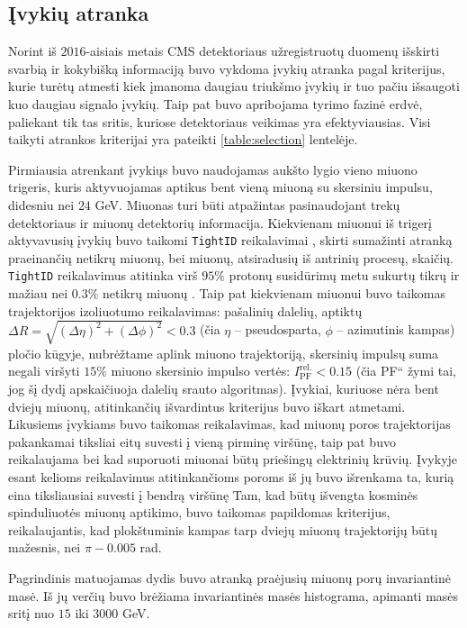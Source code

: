 \documentclass[a4paper, 12pt, oneside]{article}
\newcommand{\ttt}[1]{\texttt{#1}}
\newcommand{\ltq}[1]{{\quotedblbase{}#1\textquotedblleft{}}}
\newlength\q
\begin{document}
\subsection{Įvykių atranka}\label{sec:selection}
Norint iš $2016$-aisiais metais CMS detektoriaus užregistruotų duomenų išskirti svarbią ir kokybišką informaciją
buvo vykdoma įvykių atranka pagal kriterijus, kurie turėtų atmesti kiek įmanoma daugiau triukšmo įvykių ir tuo pačiu
išsaugoti kuo daugiau signalo įvykių.
Taip pat buvo apribojama tyrimo fazinė erdvė, paliekant tik tas sritis, kuriose detektoriaus veikimas yra efektyviausias.
Visi taikyti atrankos kriterijai yra pateikti \ref{table:selection} lentelėje.

Pirmiausia atrenkant įvykiųs buvo naudojamas aukšto lygio vieno miuono trigeris, kuris aktyvuojamas aptikus bent vieną
miuoną su skersiniu impulsu, didesniu nei $24$ GeV.
Miuonas turi būti atpažintas pasinaudojant trekų detektoriaus ir miuonų detektorių informacija.
Kiekvienam miuonui iš trigerį aktyvavusių įvykių buvo taikomi \ttt{TightID} reikalavimai \cite{MuonID}, skirti sumažinti atranką
praeinančių netikrų miuonų, bei miuonų, atsiradusių iš antrinių procesų, skaičių.
\ttt{TightID} reikalavimus atitinka virš $95\%$ protonų susidūrimų metu sukurtų tikrų ir mažiau nei $0.3\%$ netikrų
miuonų \cite{MuonID}.
Taip pat kiekvienam miuonui buvo taikomas trajektorijos izoliuotumo reikalavimas: pašalinių dalelių, aptiktų
$\Delta R = \sqrt{(\Delta\eta)^2 + (\Delta\phi)^2} < 0.3$ (čia $\eta$ -- pseudosparta, $\phi$ -- azimutinis kampas)
pločio kūgyje, nubrėžtame aplink miuono trajektoriją, skersinių impulsų suma negali
viršyti $15\%$ miuono skersinio impulso vertės: $I_{\mathrm{PF}}^{\mathrm{rel.}}<0.15$ (čia \ltq{PF} žymi tai, jog
šį dydį apskaičiuoja dalelių srauto algoritmas).
Įvykiai, kuriuose nėra bent dviejų miuonų, atitinkančių išvardintus kriterijus buvo iškart atmetami.
Likusiems įvykiams buvo taikomas reikalavimas, kad miuonų poros trajektorijas pakankamai tiksliai eitų suvesti į vieną pirminę
viršūnę, taip pat buvo reikalaujama bei kad suporuoti miuonai būtų priešingų elektrinių krūvių.
Įvykyje esant kelioms reikalavimus atitinkančioms poroms iš jų buvo išrenkama ta, kurią eina tiksliausiai suvesti į bendrą viršūnę
Tam, kad būtų išvengta kosminės spinduliuotės miuonų aptikimo, buvo taikomas papildomas kriterijus, reikalaujantis,
kad plokštuminis kampas tarp dviejų miuonų trajektorijų būtų mažesnis, nei $\pi-0.005$ rad.

Pagrindinis matuojamas dydis buvo atranką praėjusių miuonų porų invariantinė masė.
Iš jų verčių buvo brėžiama invariantinės masės histograma, apimanti masės sritį nuo $15$ iki $3000$ GeV.
\end{document}
